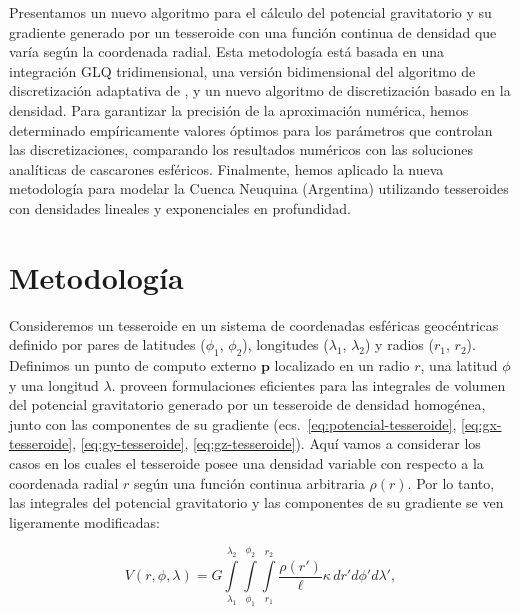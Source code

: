 Presentamos un nuevo algoritmo para el cálculo del potencial gravitatorio y su
gradiente generado por un tesseroide con una función continua de densidad que
varía según la coordenada radial.
Esta metodología está basada en una integración \ac{GLQ} tridimensional, una
versión bidimensional del algoritmo de discretización adaptativa de
\citet{uieda2016} \citep[de acuerdo con~][]{lin2019}, y un nuevo algoritmo
de discretización basado en la densidad.
Para garantizar la precisión de la aproximación numérica, hemos determinado
empíricamente valores óptimos para los parámetros que controlan las
discretizaciones, comparando los resultados numéricos con las soluciones
analíticas de cascarones esféricos.
Finalmente, hemos aplicado la nueva metodología para modelar la Cuenca
Neuquina (Argentina) utilizando tesseroides con densidades lineales
y exponenciales en profundidad.


\section{Metodología}

Consideremos un tesseroide en un sistema de coordenadas esféricas geocéntricas
definido por pares de latitudes ($\phi_1$, $\phi_2$), longitudes ($\lambda_1$,
$\lambda_2$) y radios ($r_1$, $r_2$).
Definimos un punto de computo externo $\mathbf{p}$ localizado en un radio $r$,
una latitud $\phi$ y una longitud $\lambda$.
\citet{grombein2013} proveen formulaciones eficientes para las integrales de
volumen del potencial gravitatorio generado por un tesseroide de densidad
homogénea, junto con las componentes de su gradiente
(ecs.~\ref{eq:potencial-tesseroide}, \ref{eq:gx-tesseroide},
\ref{eq:gy-tesseroide}, \ref{eq:gz-tesseroide}).
Aquí vamos a considerar los casos en los cuales el tesseroide posee una
densidad variable con respecto a la coordenada radial $r$ según una función
continua arbitraria $\rho(r)$.
Por lo tanto, las integrales del potencial gravitatorio y las componentes de su
gradiente se ven ligeramente modificadas:

\begin{equation}
    V(r,\phi,\lambda) = G
    \int\limits_{\lambda_1}^{\lambda_2}
    \int\limits_{\phi_1}^{\phi_2}
    \int\limits_{r_1}^{r_2}
    \frac{\rho(r')}{\ell} \kappa \,  dr' d\phi' d\lambda',
\label{eq:tesseroid-pot}
\end{equation}

